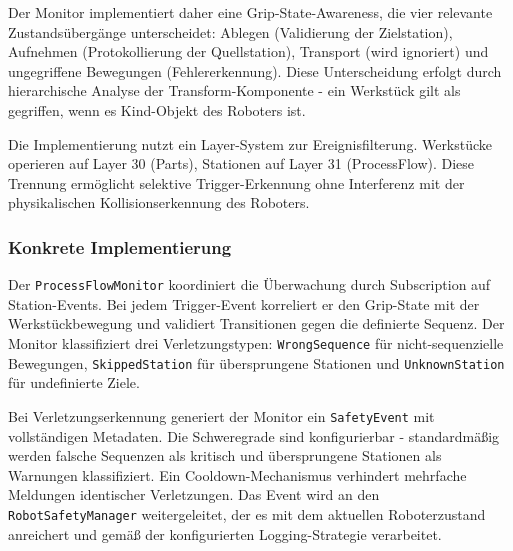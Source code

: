 \noindent
Der Monitor implementiert daher eine Grip-State-Awareness, die vier 
relevante Zustandsübergänge unterscheidet: Ablegen (Validierung der Zielstation),
Aufnehmen (Protokollierung der Quellstation), Transport (wird ignoriert) und
ungegriffene Bewegungen (Fehlererkennung). Diese Unterscheidung erfolgt durch
hierarchische Analyse der Transform-Komponente - ein Werkstück gilt als
gegriffen, wenn es Kind-Objekt des Roboters ist.

\noindent
Die Implementierung nutzt ein Layer-System zur Ereignisfilterung. Werkstücke
operieren auf Layer 30 (Parts), Stationen auf Layer 31 (ProcessFlow). Diese
Trennung ermöglicht selektive Trigger-Erkennung ohne Interferenz mit der
physikalischen Kollisionserkennung des Roboters.

\subsubsection{Konkrete Implementierung}
\noindent
Der \texttt{ProcessFlowMonitor} koordiniert die Überwachung durch Subscription
auf Station-Events. Bei jedem Trigger-Event korreliert er den Grip-State mit
der Werkstückbewegung und validiert Transitionen gegen die definierte Sequenz.
Der Monitor klassifiziert drei Verletzungstypen: \texttt{WrongSequence} für
nicht-sequenzielle Bewegungen, \texttt{SkippedStation} für übersprungene
Stationen und \texttt{UnknownStation} für undefinierte Ziele.

\noindent
Bei Verletzungserkennung generiert der Monitor ein \texttt{SafetyEvent} mit
vollständigen Metadaten. Die Schweregrade sind konfigurierbar - standardmäßig
werden falsche Sequenzen als kritisch und übersprungene Stationen als Warnungen
klassifiziert. Ein Cooldown-Mechanismus verhindert mehrfache Meldungen
identischer Verletzungen. Das Event wird an den \texttt{RobotSafetyManager}
weitergeleitet, der es mit dem aktuellen Roboterzustand anreichert und gemäß
der konfigurierten Logging-Strategie verarbeitet.

